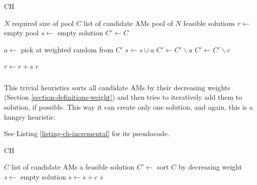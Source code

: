 \begin{algorithm}
\caption{ CH}
\label{listing-ch-fuzzy}
\begin{algorithmic}
\REQUIRE $N$ required size of pool
\REQUIRE $C$ list of candidate AMs
\ENSURE pool of $N$ feasible solutions
\STATE $r \gets $ empty pool
  \STATE {}
  \STATE $s \gets $ empty solution
  \STATE $C' \gets C$

    \STATE $a \gets $ pick at weighted random from $C'$
      \STATE $s \gets s \cup a$
      \STATE $C' \gets C' \backslash a$
    \ENDIF
        \STATE {}
        \STATE $C' \gets C' \backslash c$
      \ENDIF
    \ENDFOR
  \ENDWHILE

  \STATE $r \gets r + s$
\ENDFOR
\RETURN $r$
\end{algorithmic}
\end{algorithm}

\subsubsection{}

This trivial heuristics sorts all candidate AMs by their decreasing weights (Section \ref{section-definitions-weight}) and then tries to iteratively add them to solution, if possible. This way it can create only one solution, and again, this is a hungry heuristic.

See Listing \ref{listing-ch-incremental} for its pseudocode.

\begin{algorithm}
\caption{ CH}
\label{listing-ch-incremental}
\begin{algorithmic}
\REQUIRE $C$ list of candidate AMs
\ENSURE a feasible solution
\STATE $C' \gets $ sort $C$ by decreasing weight
\STATE $s \gets $ empty solution
    \STATE $s \gets s + c$
  \ENDIF
\ENDFOR
\RETURN $s$
\end{algorithmic}
\end{algorithm}

\subsubsection{}


